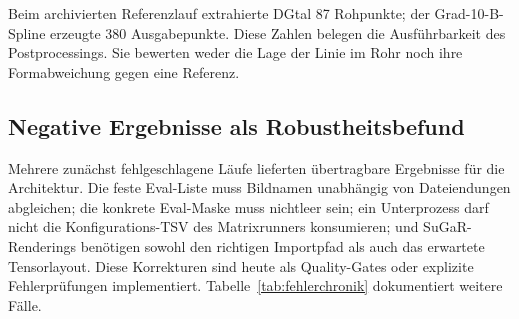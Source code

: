 Beim archivierten Referenzlauf extrahierte DGtal 87 Rohpunkte; der
Grad-10-B-Spline erzeugte 380 Ausgabepunkte. Diese Zahlen belegen die
Ausführbarkeit des Postprocessings. Sie bewerten weder die Lage der Linie im
Rohr noch ihre Formabweichung gegen eine Referenz.

\subsection{Negative Ergebnisse als Robustheitsbefund}

Mehrere zunächst fehlgeschlagene Läufe lieferten übertragbare Ergebnisse für
die Architektur. Die feste Eval-Liste muss Bildnamen unabhängig von
Dateiendungen abgleichen; die konkrete Eval-Maske muss nichtleer sein; ein
Unterprozess darf nicht die Konfigurations-TSV des Matrixrunners konsumieren;
und SuGaR-Renderings benötigen sowohl den richtigen Importpfad als auch das
erwartete Tensorlayout. Diese Korrekturen sind heute als Quality-Gates oder
explizite Fehlerprüfungen implementiert. Tabelle~\ref{tab:fehlerchronik}
dokumentiert weitere Fälle.
